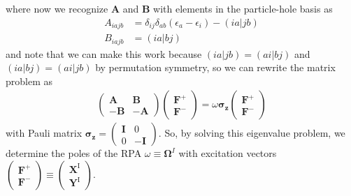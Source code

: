 where now we recognize $\mathbf{A}$ and $\mathbf{B}$ with elements in the particle-hole basis as
\begin{align}
    A_{i a j b} &= \delta_{i j} \delta_{a b} \left(\epsilon_{a} - \epsilon_{i}\right) - (i a | j b) \\
    B_{i a j b} &= (i a | b j)
\end{align}
and note that we can make this work because $(ia|jb)=(ai|bj)$ and $(ia|bj)=(ai|jb)$ by permutation symmetry, so we can rewrite the matrix problem as
\begin{align}
    \begin{pmatrix}
        \mathbf{A} & \mathbf{B} \\
        -\mathbf{B} & -\mathbf{A}
    \end{pmatrix}
\begin{pmatrix}
    \mathbf{F}^{+} \\
    \mathbf{F}^{-}
\end{pmatrix} = \omega \mathbf{\sigma_z}
\begin{pmatrix}
    \mathbf{F}^{+} \\
    \mathbf{F}^{-}
\end{pmatrix}
\end{align}
with Pauli matrix $\mathbf{\sigma_z}=\begin{pmatrix}
    \mathbf{I} & 0 \\
    0 & -\mathbf{I}
\end{pmatrix}$.
So, by solving this eigenvalue problem, we determine the poles of the RPA $\omega \equiv\mathbf{\Omega}^I$ with excitation vectors $\begin{pmatrix}
    \mathbf{F}^{+} \\
    \mathbf{F}^{-}
\end{pmatrix} \equiv \begin{pmatrix}
    \mathbf{X}^{\mathrm{I}} \\
    \mathbf{Y}^{\mathrm{I}}
\end{pmatrix}$. 

